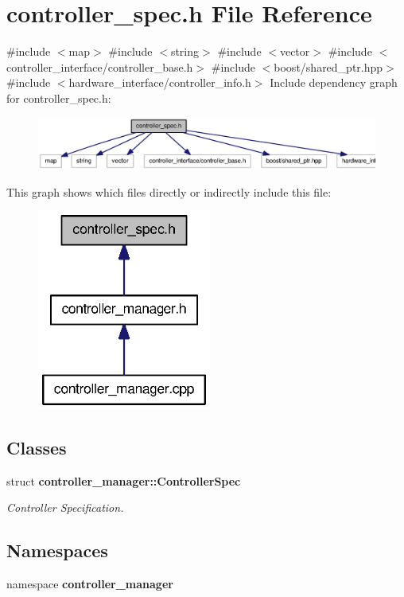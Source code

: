 \section{controller\-\_\-spec.\-h \-File \-Reference}
\label{controller__spec_8h}
{\ttfamily \#include $<$map$>$}\*
{\ttfamily \#include $<$string$>$}\*
{\ttfamily \#include $<$vector$>$}\*
{\ttfamily \#include $<$controller\-\_\-interface/controller\-\_\-base.\-h$>$}\*
{\ttfamily \#include $<$boost/shared\-\_\-ptr.\-hpp$>$}\*
{\ttfamily \#include $<$hardware\-\_\-interface/controller\-\_\-info.\-h$>$}\*
\-Include dependency graph for controller\-\_\-spec.\-h\-:
\nopagebreak
\begin{figure}[H]
\begin{center}
\leavevmode
\includegraphics[width=350pt]{controller__spec_8h__incl}
\end{center}
\end{figure}
\-This graph shows which files directly or indirectly include this file\-:
\nopagebreak
\begin{figure}[H]
\begin{center}
\leavevmode
\includegraphics[width=162pt]{controller__spec_8h__dep__incl}
\end{center}
\end{figure}
\subsection*{\-Classes}
\begin{DoxyCompactItemize}
\item 
struct {\bf controller\-\_\-manager\-::\-Controller\-Spec}
\begin{DoxyCompactList}\small\item\em \-Controller \-Specification. \end{DoxyCompactList}\end{DoxyCompactItemize}
\subsection*{\-Namespaces}
\begin{DoxyCompactItemize}
\item 
namespace {\bf controller\-\_\-manager}
\end{DoxyCompactItemize}
